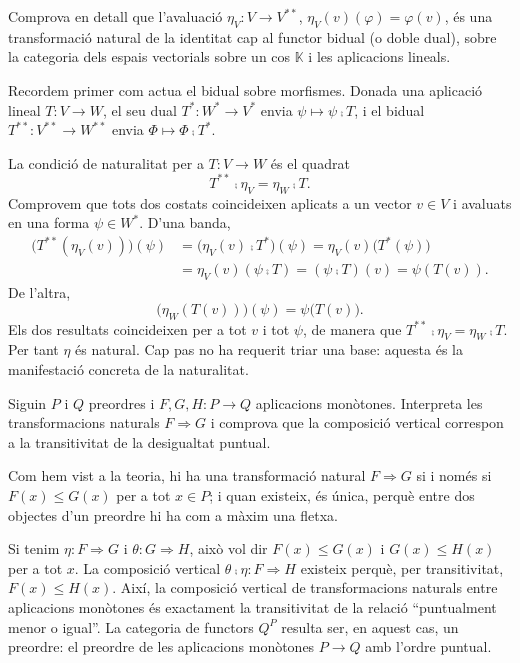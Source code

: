 \begin{exercici}
Comprova en detall que l'avaluació $\eta_V\colon V\to V^{**}$, $\eta_V(v)(\varphi)=\varphi(v)$, és una transformació natural de la identitat cap al functor bidual (o doble dual), sobre la categoria dels espais vectorials sobre un cos $\mathbb K$ i les aplicacions lineals.
\end{exercici}

\begin{solucio}
Recordem primer com actua el bidual sobre morfismes. Donada una aplicació lineal $T\colon V\to W$, el seu dual $T^*\colon W^*\to V^*$ envia $\psi\mapsto\psi\comp T$, i el bidual $T^{**}\colon V^{**}\to W^{**}$ envia $\Phi\mapsto\Phi\comp T^*$.

La condició de naturalitat per a $T\colon V\to W$ és el quadrat
\[
T^{**}\comp\eta_V=\eta_W\comp T.
\]
Comprovem que tots dos costats coincideixen aplicats a un vector $v\in V$ i avaluats en una forma $\psi\in W^*$. D'una banda,
\[
\begin{aligned}
\big(T^{**}(\eta_V(v))\big)(\psi)
&=\big(\eta_V(v)\comp T^*\big)(\psi)
=\eta_V(v)\big(T^*(\psi)\big)\\
&=\eta_V(v)(\psi\comp T)
=(\psi\comp T)(v)
=\psi(T(v)).
\end{aligned}
\]
De l'altra,
\[
\big(\eta_W(T(v))\big)(\psi)=\psi\big(T(v)\big).
\]
Els dos resultats coincideixen per a tot $v$ i tot $\psi$, de manera que $T^{**}\comp\eta_V=\eta_W\comp T$. Per tant $\eta$ és natural. Cap pas no ha requerit triar una base: aquesta és la manifestació concreta de la naturalitat.
\end{solucio}

\begin{exercici}
Siguin $P$ i $Q$ preordres i $F,G,H\colon P\to Q$ aplicacions monòtones. Interpreta les transformacions naturals $F\Rightarrow G$ i comprova que la composició vertical correspon a la transitivitat de la desigualtat puntual.
\end{exercici}

\begin{solucio}
Com hem vist a la teoria, hi ha una transformació natural $F\Rightarrow G$ si i només si $F(x)\leq G(x)$ per a tot $x\in P$; i quan existeix, és única, perquè entre dos objectes d'un preordre hi ha com a màxim una fletxa.

Si tenim $\eta\colon F\Rightarrow G$ i $\theta\colon G\Rightarrow H$, això vol dir $F(x)\leq G(x)$ i $G(x)\leq H(x)$ per a tot $x$. La composició vertical $\theta\comp\eta\colon F\Rightarrow H$ existeix perquè, per transitivitat, $F(x)\leq H(x)$. Així, la composició vertical de transformacions naturals entre aplicacions monòtones és exactament la transitivitat de la relació \enquote{puntualment menor o igual}. La categoria de functors $Q^{P}$ resulta ser, en aquest cas, un preordre: el preordre de les aplicacions monòtones $P\to Q$ amb l'ordre puntual.
\end{solucio}

